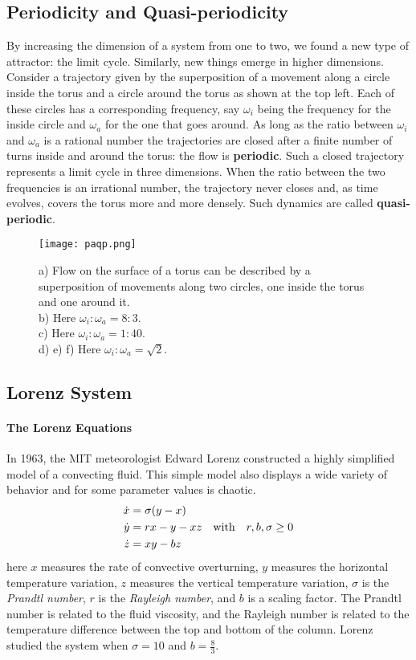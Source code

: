 \subsection{Periodicity and Quasi-periodicity}{\label{sec:paqp}}
By increasing the dimension of a system from one to two, we found a new type of attractor: the limit cycle.
Similarly, new things emerge in higher dimensions.\\
Consider a trajectory given by the superposition of a movement along a circle inside the torus and a circle around the torus as shown at the top left.
Each of these circles has a corresponding frequency, say $\omega_i$ being the frequency for the inside circle and $\omega_a$ for the one that goes around.
As long as the ratio between $\omega_i$ and $\omega_a$ is a rational number the trajectories are closed after a finite number of turns inside and around the torus: the flow is {\textbf{periodic}}.
Such a closed trajectory represents a limit cycle in three dimensions.
When the ratio between the two frequencies is an irrational number, the trajectory never closes and, as time evolves, covers the torus more and more densely.
Such dynamics are called {\textbf{quasi-periodic}}.
\begin{figure}[h!]
	\centering
	\texttt{[image: paqp.png]}
	\caption{a) Flow on the surface of a torus can be described by a superposition of movements along two circles, one inside the torus and one around it.\\b) Here $\omega_i:\omega_a=8:3$.\\c) Here $\omega_i:\omega_a=1:40$.\\d) e) f) Here $\omega_i:\omega_a=\sqrt{2}$.}
	\label{fig:paqp}
\end{figure}
\subsection{Lorenz System}{\label{sec:ls}}
\paragraph{The Lorenz Equations}
In 1963, the MIT meteorologist Edward Lorenz constructed a highly simplified model of a convecting fluid.
This simple model also displays a wide variety of behavior and for some parameter values is chaotic.
\begin{equation}{\label{eq:ls}}
	\begin{aligned}
		\dot{x}&=\sigma(y-x)\\
		\dot{y}&=rx-y-xz\quad\text{with}\quad r,b,\sigma\geq0\\
		\dot{z}&=xy-bz
	\end{aligned}
\end{equation}
here $x$ measures the rate of convective overturning, $y$ measures the horizontal temperature variation, $z$ measures the vertical temperature variation, $\sigma$ is the \emph{Prandtl number}, $r$ is the \emph{Rayleigh number}, and $b$ is a scaling factor.
The Prandtl number is related to the fluid viscosity, and the Rayleigh number is related to the temperature difference between the top and bottom of the column.
Lorenz studied the system when $\sigma=10$ and $b=\frac{8}{3}$.\\
